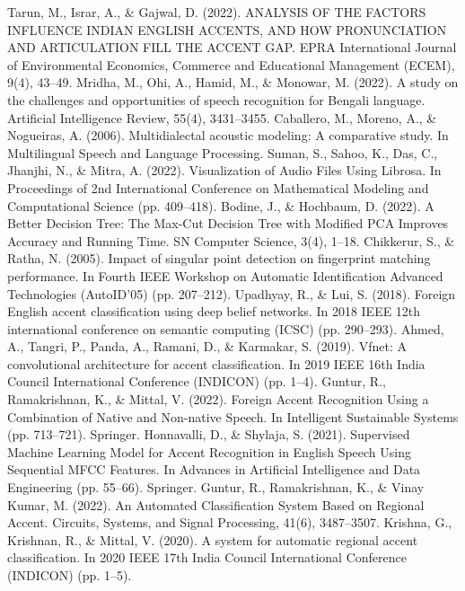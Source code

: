 \begin{thebibliography}{9}

Tarun, M., Israr, A., \& Gajwal, D. (2022). ANALYSIS OF THE FACTORS INFLUENCE INDIAN ENGLISH ACCENTS, AND HOW PRONUNCIATION AND ARTICULATION FILL THE ACCENT GAP. EPRA International Journal of Environmental Economics, Commerce and Educational Management (ECEM), 9(4), 43–49.
 Mridha, M., Ohi, A., Hamid, M., \& Monowar, M. (2022). A study on the challenges and opportunities of speech recognition for Bengali language. Artificial Intelligence Review, 55(4), 3431–3455.
 Caballero, M., Moreno, A., \& Nogueiras, A. (2006). Multidialectal acoustic modeling: A comparative study. In Multilingual Speech and Language Processing.
 Suman, S., Sahoo, K., Das, C., Jhanjhi, N., \& Mitra, A. (2022). Visualization of Audio Files Using Librosa. In Proceedings of 2nd International Conference on Mathematical Modeling and Computational Science (pp. 409–418).
 Bodine, J., \& Hochbaum, D. (2022). A Better Decision Tree: The Max-Cut Decision Tree with Modified PCA Improves Accuracy and Running Time. SN Computer Science, 3(4), 1–18.
Chikkerur, S., \& Ratha, N. (2005). Impact of singular point detection on fingerprint matching performance. In Fourth IEEE Workshop on Automatic Identification Advanced Technologies (AutoID'05) (pp. 207–212).
 Upadhyay, R., \& Lui, S. (2018). Foreign English accent classification using deep belief networks. In 2018 IEEE 12th international conference on semantic computing (ICSC) (pp. 290–293).
 Ahmed, A., Tangri, P., Panda, A., Ramani, D., \& Karmakar, S. (2019). Vfnet: A convolutional architecture for accent classification. In 2019 IEEE 16th India Council International Conference (INDICON) (pp. 1–4).
 Guntur, R., Ramakrishnan, K., \& Mittal, V. (2022). Foreign Accent Recognition Using a Combination of Native and Non-native Speech. In Intelligent Sustainable Systems (pp. 713–721). Springer.
 Honnavalli, D., \& Shylaja, S. (2021). Supervised Machine Learning Model for Accent Recognition in English Speech Using Sequential MFCC Features. In Advances in Artificial Intelligence and Data Engineering (pp. 55–66). Springer.
 Guntur, R., Ramakrishnan, K., \& Vinay Kumar, M. (2022). An Automated Classification System Based on Regional Accent. Circuits, Systems, and Signal Processing, 41(6), 3487–3507.
 Krishna, G., Krishnan, R., \& Mittal, V. (2020). A system for automatic regional accent classification. In 2020 IEEE 17th India Council International Conference (INDICON) (pp. 1–5).

\end{thebibliography}
